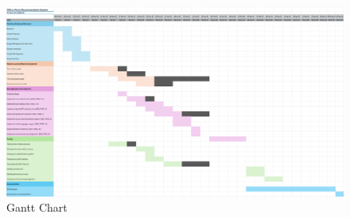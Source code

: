 \begin{landscape}
\setcounter{figure}{0}
\setcounter{table}{0} 
    \begin{figure}[H]
        \centering
        \includegraphics[width=23cm]{Images/gantt.png}
        \caption{Gantt Chart}
        \label{fig:gantt-chart}
    \end{figure}
\end{landscape}

\newpage

